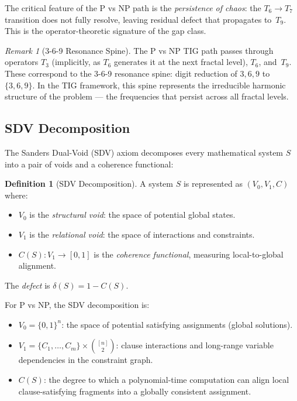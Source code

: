 \documentclass[11pt]{article}
\theoremstyle{definition}
\newtheorem{definition}[theorem]{Definition}
\theoremstyle{remark}
\newtheorem{remark}[theorem]{Remark}
\begin{document}
The critical feature of the P vs NP path is the \emph{persistence of
chaos}: the $T_6 \to T_7$ transition does not fully resolve, leaving
residual defect that propagates to~$T_9$.  This is the operator-theoretic
signature of the gap class.

\begin{remark}[3-6-9 Resonance Spine]
The P vs NP TIG path passes through operators $T_3$ (implicitly, as
$T_6$ generates it at the next fractal level), $T_6$, and~$T_9$.
These correspond to the 3-6-9 resonance spine: digit reduction of
$3, 6, 9$ to $\{3, 6, 9\}$.  In the TIG framework, this spine
represents the irreducible harmonic structure of the problem ---
the frequencies that persist across all fractal levels.
\end{remark}

\subsection{SDV Decomposition}

The Sanders Dual-Void (SDV) axiom decomposes every mathematical system
$S$ into a pair of voids and a coherence functional:

\begin{definition}[SDV Decomposition]
\label{def:sdv}
A system $S$ is represented as $(V_0, V_1, C)$ where:
\begin{itemize}
  \item $V_0$ is the \emph{structural void}: the space of potential global states.
  \item $V_1$ is the \emph{relational void}: the space of interactions and constraints.
  \item $C(S) : V_1 \to [0,1]$ is the \emph{coherence functional}, measuring
    local-to-global alignment.
\end{itemize}
The \emph{defect} is $\delta(S) = 1 - C(S)$.
\end{definition}

For P vs NP, the SDV decomposition is:
\begin{itemize}
  \item $V_0 = \{0,1\}^n$: the space of potential satisfying assignments
    (global solutions).
  \item $V_1 = \{C_1, \ldots, C_m\} \times \binom{[n]}{2}$: clause interactions
    and long-range variable dependencies in the constraint graph.
  \item $C(S)$: the degree to which a polynomial-time computation can align
    local clause-satisfying fragments into a globally consistent assignment.
\end{itemize}
\end{document}

